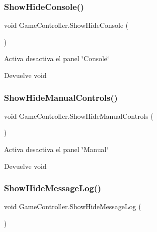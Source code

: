 \subsubsection{\texorpdfstring{ShowHideConsole()}{ShowHideConsole()}}
{\footnotesize\ttfamily void Game\+Controller.\+Show\+Hide\+Console (\begin{DoxyParamCaption}{ }\end{DoxyParamCaption})\hspace{0.3cm}{\ttfamily [inline]}}

Activa desactiva el panel \char`\"{}\+Console\char`\"{} \begin{DoxyReturn}{Devuelve}
void 
\end{DoxyReturn}
\mbox{\label{class_game_controller_ab55a4d6d21f7e08aac2e27ad92033d56}} 
\subsubsection{\texorpdfstring{ShowHideManualControls()}{ShowHideManualControls()}}
{\footnotesize\ttfamily void Game\+Controller.\+Show\+Hide\+Manual\+Controls (\begin{DoxyParamCaption}{ }\end{DoxyParamCaption})\hspace{0.3cm}{\ttfamily [inline]}}

Activa desactiva el panel \char`\"{}\+Manual\char`\"{} \begin{DoxyReturn}{Devuelve}
void 
\end{DoxyReturn}
\mbox{\label{class_game_controller_a3424f128577eb9fca02bc4eeb5c00f52}} 
\subsubsection{\texorpdfstring{ShowHideMessageLog()}{ShowHideMessageLog()}}
{\footnotesize\ttfamily void Game\+Controller.\+Show\+Hide\+Message\+Log (\begin{DoxyParamCaption}{ }\end{DoxyParamCaption})\hspace{0.3cm}{\ttfamily [inline]}}

